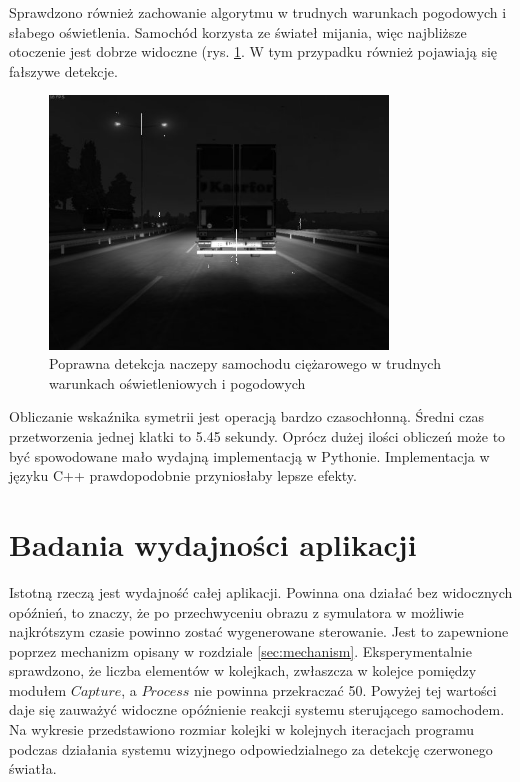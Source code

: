 Sprawdzono również zachowanie algorytmu w trudnych warunkach pogodowych i słabego oświetlenia. 
Samochód korzysta ze świateł mijania, więc najbliższe otoczenie jest dobrze widoczne (rys. \ref{fig:alg3_rain_late}. 
W tym przypadku również pojawiają się fałszywe detekcje.

\begin{figure}
  \centering
  \includegraphics[width=9cm]{img/alg3_res3.jpg}
  \caption{Poprawna detekcja naczepy samochodu ciężarowego w trudnych warunkach oświetleniowych i pogodowych}
  \label{fig:alg3_rain_late}
\end{figure}

Obliczanie wskaźnika symetrii jest operacją bardzo czasochłonną. 
Średni czas przetworzenia jednej klatki to 5.45 sekundy. 
Oprócz dużej ilości obliczeń może to być spowodowane mało wydajną implementacją w Pythonie. 
Implementacja w języku C++ prawdopodobnie przyniosłaby lepsze efekty.


\section{Badania wydajności aplikacji}

Istotną rzeczą jest wydajność całej aplikacji. 
Powinna ona działać bez widocznych opóźnień, to znaczy, że po przechwyceniu obrazu z symulatora w możliwie najkrótszym czasie powinno zostać wygenerowane sterowanie. 
Jest to zapewnione poprzez mechanizm opisany w rozdziale \ref{sec:mechanism}. %
Eksperymentalnie sprawdzono, że liczba elementów w kolejkach, zwłaszcza w kolejce pomiędzy modułem $Capture$, a $Process$ nie powinna przekraczać 50. %
Powyżej tej wartości daje się zauważyć widoczne opóźnienie reakcji systemu sterującego samochodem. 
Na wykresie przedstawiono rozmiar kolejki w kolejnych iteracjach programu podczas działania systemu wizyjnego odpowiedzialnego za detekcję czerwonego światła.

